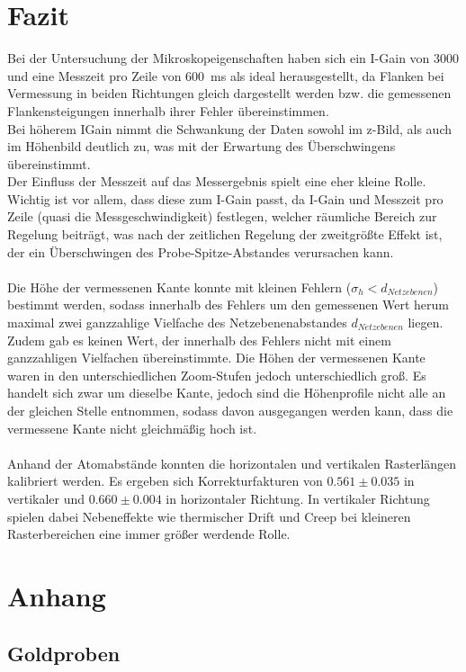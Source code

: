\documentclass[12pt,a4paper]{article}
\begin{document}
\section{Fazit}
Bei der Untersuchung der Mikroskopeigenschaften haben sich ein I-Gain von 3000 und eine Messzeit pro Zeile von \SI{600}{ms} als ideal herausgestellt, da Flanken bei Vermessung in beiden Richtungen gleich dargestellt werden bzw. die gemessenen Flankensteigungen innerhalb ihrer Fehler übereinstimmen.\\
Bei höherem IGain nimmt die Schwankung der Daten sowohl im z-Bild, als auch im Höhenbild deutlich zu, was mit der Erwartung des Überschwingens übereinstimmt.\\
Der Einfluss der Messzeit auf das Messergebnis spielt eine eher kleine Rolle. Wichtig ist vor allem, dass diese zum I-Gain passt, da I-Gain und Messzeit pro Zeile (quasi die Messgeschwindigkeit) festlegen, welcher räumliche Bereich zur Regelung beiträgt, was nach der zeitlichen Regelung der zweitgrößte Effekt ist, der ein Überschwingen des Probe-Spitze-Abstandes verursachen kann. \\
\\
Die Höhe der vermessenen Kante konnte mit kleinen Fehlern ($\sigma _h < d_{Netzebenen}$) bestimmt werden, sodass innerhalb des Fehlers um den gemessenen Wert herum maximal zwei ganzzahlige Vielfache des Netzebenenabstandes $d_{Netzebenen}$ liegen. Zudem gab es keinen Wert, der innerhalb des Fehlers nicht mit einem ganzzahligen Vielfachen übereinstimmte. Die Höhen der vermessenen Kante waren in den unterschiedlichen Zoom-Stufen jedoch unterschiedlich groß. Es handelt sich zwar um dieselbe Kante, jedoch sind die Höhenprofile nicht alle an der gleichen Stelle entnommen, sodass davon ausgegangen werden kann, dass die vermessene Kante nicht gleichmäßig hoch ist.\\
\\
Anhand der Atomabstände konnten die horizontalen und vertikalen Rasterlängen kalibriert werden. Es ergeben sich Korrekturfakturen von $0.561\pm 0.035$ in vertikaler und $0.660\pm 0.004$ in horizontaler Richtung. In vertikaler Richtung spielen dabei Nebeneffekte wie thermischer Drift und Creep bei kleineren Rasterbereichen eine immer größer werdende Rolle.


\newpage
\section{Anhang}
\subsection{Goldproben}
\end{document}

